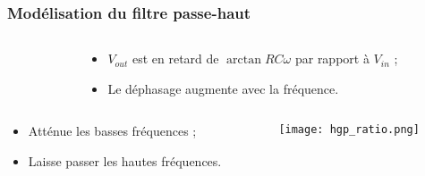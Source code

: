 \documentclass[pdf]{beamer}
\begin{document}
\begin{frame}
	\frametitle{Modélisation du filtre passe-haut}
	
	\begin{columns}
		\begin{column}{5cm}
		\end{column}
		
		\begin{column}{5cm}
			\begin{itemize}
				\item $V_{out}$ est en retard de $\arctan{RC\omega}$ par rapport à $V_{in}$ ;
				\item Le déphasage augmente avec la fréquence.
			\end{itemize}
		\end{column}
	\end{columns}
	
	\begin{columns}
		\begin{column}{5cm}
			\begin{itemize}
				\item Atténue les basses fréquences ;
				\item Laisse passer les hautes fréquences.
			\end{itemize}
		\end{column}

		\begin{column}{5cm}
			\scalebox{0.5}
			{\texttt{[image: hgp\_ratio.png]}}
		\end{column}
	\end{columns}
\end{frame}
\end{document}
